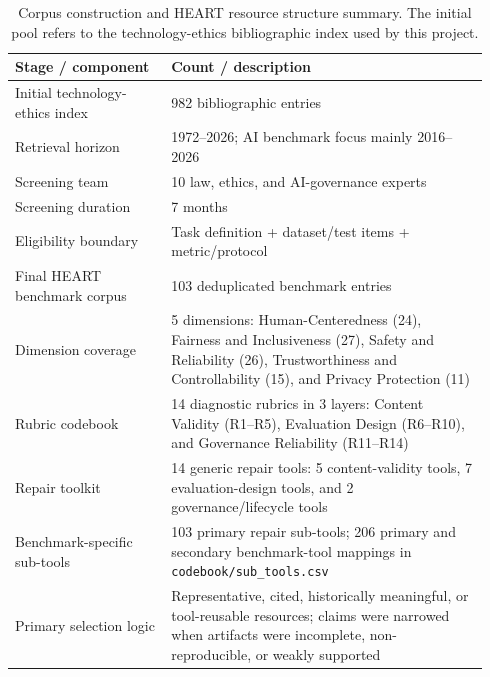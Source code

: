 \begin{table}[t]
\centering
\small
\caption{Corpus construction and HEART resource structure summary. The initial
pool refers to the technology-ethics bibliographic index used by this project.}
\label{tab:corpus-construction}
\begin{tabular}{@{}p{0.31\linewidth}p{0.63\linewidth}@{}}
\toprule
Stage / component & Count / description \\
\midrule
Initial technology-ethics index & 982 bibliographic entries \\
Retrieval horizon & 1972--2026; AI benchmark focus mainly 2016--2026 \\
Screening team & 10 law, ethics, and AI-governance experts \\
Screening duration & 7 months \\
Eligibility boundary & Task definition + dataset/test items + metric/protocol \\
Final HEART benchmark corpus & 103 deduplicated benchmark entries \\
Dimension coverage & 5 dimensions: Human-Centeredness (24), Fairness and
Inclusiveness (27), Safety and Reliability (26), Trustworthiness and
Controllability (15), and Privacy Protection (11) \\
Rubric codebook & 14 diagnostic rubrics in 3 layers: Content Validity
(R1--R5), Evaluation Design (R6--R10), and Governance Reliability (R11--R14) \\
Repair toolkit & 14 generic repair tools: 5 content-validity tools, 7
evaluation-design tools, and 2 governance/lifecycle tools \\
Benchmark-specific sub-tools & 103 primary repair sub-tools; 206 primary and
secondary benchmark-tool mappings in \texttt{codebook/sub\_tools.csv} \\
Primary selection logic & Representative, cited, historically meaningful, or
tool-reusable resources; claims were narrowed when artifacts were incomplete,
non-reproducible, or weakly supported \\
\bottomrule
\end{tabular}
\end{table}
